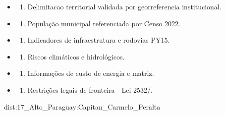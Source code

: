 {\begin{itemize}
\tightlist
\item
  \begin{enumerate}
  \def\labelenumi{\arabic{enumi})}
  \tightlist
  \item
    Delimitacao territorial validada por georreferencia institucional.
  \end{enumerate}
\item
  \begin{enumerate}
  \def\labelenumi{\arabic{enumi})}
  \setcounter{enumi}{1}
  \tightlist
  \item
    População municipal referenciada por Censo 2022.
  \end{enumerate}
\item
  \begin{enumerate}
  \def\labelenumi{\arabic{enumi})}
  \setcounter{enumi}{2}
  \tightlist
  \item
    Indicadores de infraestrutura e rodovias PY15.
  \end{enumerate}
\item
  \begin{enumerate}
  \def\labelenumi{\arabic{enumi})}
  \setcounter{enumi}{3}
  \tightlist
  \item
    Riscos climáticos e hidrológicos.
  \end{enumerate}
\item
  \begin{enumerate}
  \def\labelenumi{\arabic{enumi})}
  \setcounter{enumi}{4}
  \tightlist
  \item
    Informações de custo de energia e matriz.
  \end{enumerate}
\item
  \begin{enumerate}
  \def\labelenumi{\arabic{enumi})}
  \setcounter{enumi}{5}
  \tightlist
  \item
    Restrições legais de fronteira - Lei 2532/.
  \end{enumerate}
\end{itemize}}{dist:17_Alto_Paraguay:Capitan_Carmelo_Peralta}
